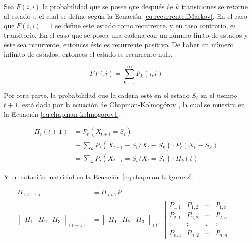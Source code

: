 \normalsize{Sea $F(i,i)$ la probabilidad que se posee que después de $k$ transiciones se retorne al estado $i$, el cual se define según la Ecuación} \ref{eq:recurrentedMarkov}. \normalsize{En el caso que $F(i,i)=1$ se define este estado como recurrente, y en caso contrario, es transitorio. En el caso que se posea una cadena con un número finito de estados y éste sea recurrente, entonces éste es recurrente positivo. De haber un número infinito de estados, entonces el estado es recurrente nulo.}

\begin{equation} \label{eq:recurrentedMarkov}
	F(i,i) = \sum_{k=1}^{\infty}{F_k(i,i)}
\end{equation}

Por otra parte, la probabilidad que la cadena esté en el estado $S_i$ en el tiempo $t+1$, está dada por la ecuación de Chapman-Kolmogórov \citep{Papoulis1984}, la cual se muestra en la Ecuación \ref{eq:chapman-kolmogorov1}.

\begin{equation} \label{eq:chapman-kolmogorov1}
\begin{split}
	\Pi_{i} (t+1) &= P_r(X_{t+i}=S_i) \\
				  &= \sum _{k} P_r(X_{t+i} = S_i / X_t = S_k)·P_r(X_t = S_k)\\
				  &= \sum _{k} P_r(X_{t+i} = S_i / X_t = S_k)·\Pi_{k} (t)
\end{split}	
\end{equation}

Y en notación matricial en la Ecuación \ref{eq:chapman-kolgorov2}.

\begin{equation} \label{eq:chapman-kolgorov2}
\begin{split}
	\Pi_{(t+1)} &= \Pi_{(t)}P\\
	\begin{bmatrix}
		\Pi_1 & \Pi_2 & \Pi_3
	\end{bmatrix} _{(t+1)}
	&= \begin{bmatrix}
		\Pi_1 & \Pi_2 & \Pi_3
	\end{bmatrix} _{(t)}
	\begin{bmatrix}
		P_{1,1} & P_{1,2} & \cdots & P_{1,n} \\
		P_{2,1} & P_{2,2} & \cdots & P_{2,n} \\
		\vdots  & \vdots  & \ddots & \vdots  \\
		P_{n,1} & P_{n,2} & \cdots & P_{n,n}
	\end{bmatrix}
\end{split}
\end{equation}

